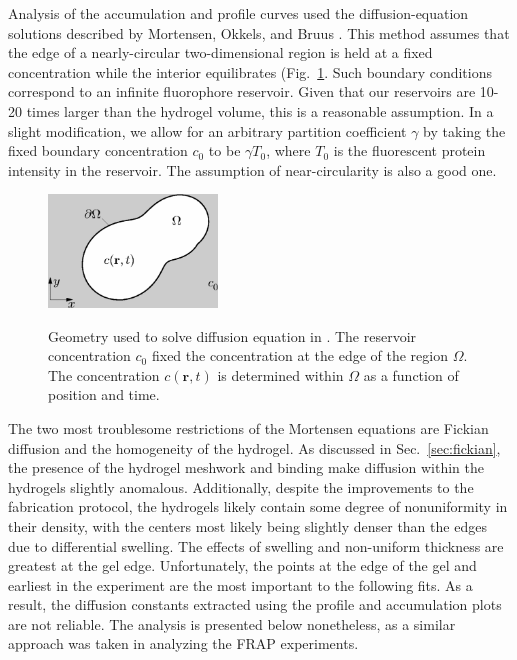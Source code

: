 Analysis of the accumulation and profile curves used the diffusion-equation solutions described by Mortensen, Okkels, and Bruus \cite{mortensen06}.  This method assumes that the edge of  a nearly-circular two-dimensional region is held at a fixed concentration while the interior equilibrates (Fig.~\ref{fig:mortensen}.  Such boundary conditions correspond to an infinite fluorophore reservoir.  Given that our reservoirs are 10-20 times larger than the hydrogel volume, this is a reasonable assumption.  In a slight modification, we allow for an arbitrary partition coefficient $\gamma$ by taking the fixed boundary concentration $c_0$ to be $\gamma T_0$, where $T_0$ is the fluorescent protein intensity in the reservoir.  The assumption of near-circularity is also a good one.

\begin{figure}
\caption[Geometry of profile and accumulation model.]{Geometry used to solve diffusion equation in \cite{mortensen06}.  The reservoir concentration $c_0$ fixed the concentration at the edge of the region $\Omega$.  The concentration $c(\mathbf{r},t)$ is determined within $\Omega$ as a function of position and time.}
\centering
\includegraphics[width=0.4\textwidth]{figs/ch04/mortensen}
\label{fig:mortensen}
\end{figure}

The two most troublesome restrictions of the Mortensen equations are Fickian diffusion and the homogeneity of the hydrogel.  As discussed in Sec.~\ref{sec:fickian}, the presence of the hydrogel meshwork and binding make diffusion within the hydrogels slightly anomalous.  Additionally, despite the improvements to the fabrication protocol, the hydrogels likely contain some degree of nonuniformity in their density, with the centers most likely being slightly denser than the edges due to differential swelling.  The effects of swelling and non-uniform thickness are greatest at the gel edge.  Unfortunately, the points at the edge of the gel and earliest in the experiment are the most important to the following fits.  As a result, the diffusion constants extracted using the profile and accumulation plots are not reliable.  The analysis is presented below nonetheless, as a similar approach was taken in analyzing the FRAP experiments.

